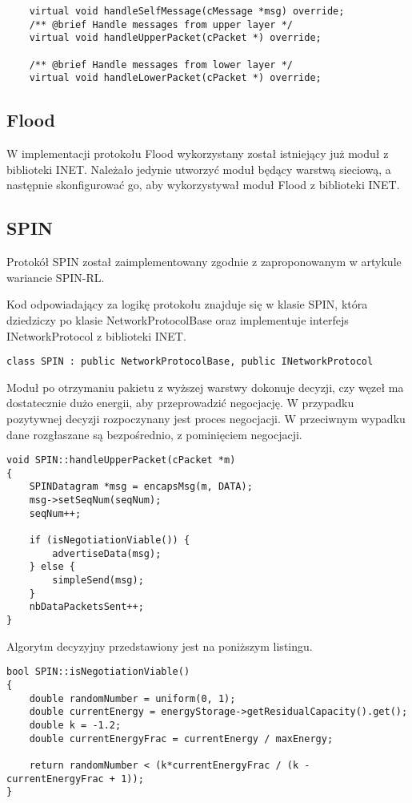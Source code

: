\begin{verbatim}
    virtual void handleSelfMessage(cMessage *msg) override;
    /** @brief Handle messages from upper layer */
    virtual void handleUpperPacket(cPacket *) override;

    /** @brief Handle messages from lower layer */
    virtual void handleLowerPacket(cPacket *) override;
\end{verbatim}
\subsection{Flood}
W implementacji protokołu Flood wykorzystany został istniejący już moduł z biblioteki INET. Należało jedynie utworzyć  moduł będący warstwą sieciową, a następnie skonfigurować go, aby wykorzystywał moduł Flood z biblioteki INET.
\subsection{SPIN}
Protokół SPIN został zaimplementowany zgodnie z zaproponowanym w artykule \cite{Kulik2002} wariancie SPIN-RL.

Kod odpowiadający za logikę protokołu znajduje się w klasie SPIN, która dziedziczy po klasie NetworkProtocolBase oraz implementuje interfejs INetworkProtocol z biblioteki INET.

\begin{verbatim}
class SPIN : public NetworkProtocolBase, public INetworkProtocol
\end{verbatim}

Moduł po otrzymaniu pakietu z wyższej warstwy dokonuje decyzji, czy węzeł ma dostatecznie dużo energii, aby przeprowadzić negocjację. W przypadku pozytywnej decyzji rozpoczynany jest proces negocjacji. W przeciwnym wypadku dane rozgłaszane są bezpośrednio, z pominięciem negocjacji.

\begin{verbatim}
void SPIN::handleUpperPacket(cPacket *m)
{
    SPINDatagram *msg = encapsMsg(m, DATA);
    msg->setSeqNum(seqNum);
    seqNum++;

    if (isNegotiationViable()) {
        advertiseData(msg);
    } else {
        simpleSend(msg);
    }
    nbDataPacketsSent++;
}
\end{verbatim}

Algorytm decyzyjny przedstawiony jest na poniższym listingu.

\begin{verbatim}
bool SPIN::isNegotiationViable()
{
    double randomNumber = uniform(0, 1);
    double currentEnergy = energyStorage->getResidualCapacity().get();
    double k = -1.2;
    double currentEnergyFrac = currentEnergy / maxEnergy;

    return randomNumber < (k*currentEnergyFrac / (k - currentEnergyFrac + 1));
}
\end{verbatim}

